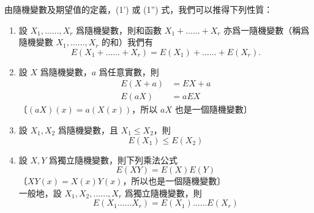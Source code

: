\medskip
由隨機變數及期望值的定義，(1') 或 (1'') 式，我們可以推得下列性質：
\begin{enumerate}[label=\arabic*., leftmargin=2em, itemsep=0.3em]
  \item 設 $X_1, \ldots\ldots, X_r$ 爲隨機變數，則和函數 $X_1 + \ldots\ldots + X_r$ 亦爲一隨機變數（稱爲隨機變數 $X_1, \ldots\ldots, X_r$ 的和）我們有
  \begin{equation}\tag{2}\label{eq:b5-5-2-2}
  E(X_1 + \ldots\ldots + X_r) = E(X_1) + \ldots\ldots + E(X_r).
  \end{equation}
  \item 設 $X$ 爲隨機變數，$a$ 爲任意實數，則
  \begin{align}
  E(X+a) &= EX + a \tag{3}\label{eq:b5-5-2-3} \\
  E(aX) &= aEX \tag{4}\label{eq:b5-5-2-4}
  \end{align}
  〔$(aX)(x) = a(X(x))$，所以 $aX$ 也是一個隨機變數〕
  \item 設 $X_1, X_2$ 爲隨機變數，且 $X_1 \le X_2$，則
  \begin{equation}\tag{5}\label{eq:b5-5-2-5}
  E(X_1) \le E(X_2)
  \end{equation}
  \item 設 $X, Y$ 爲獨立隨機變數，則下列乘法公式
  \begin{equation}\tag{6}\label{eq:b5-5-2-6}
  E(XY) = E(X)E(Y)
  \end{equation}
  〔$XY(x) = X(x)Y(x)$，所以也是一個隨機變數〕\\
  一般地，設 $X_1, X_2, \ldots\ldots, X_r$ 爲獨立隨機變數，則
  \begin{equation}\tag{$6'$}\label{eq:b5-5-2-6p}
  E(X_1 \ldots\ldots X_r) = E(X_1) \ldots\ldots E(X_r)
  \end{equation}
\end{enumerate}

\medskip
